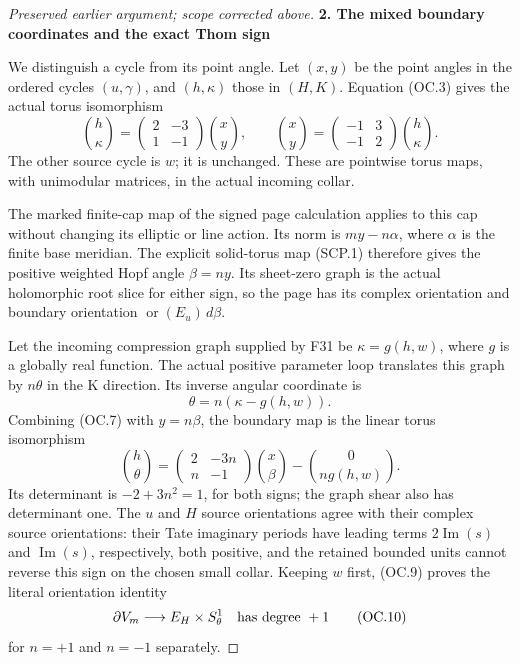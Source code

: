 \begin{proof}[Preserved earlier argument; scope corrected above]
\par

\medskip\noindent\textbf{2. The mixed boundary coordinates and the exact Thom sign}

\par\nobreak

We distinguish a cycle from its point angle. Let \((x,y)\) be the point
angles in the ordered cycles \((u,\gamma)\), and \((h,\kappa)\) those in
\((H,K)\). Equation (OC.3) gives the actual torus isomorphism
\[
 \binom h\kappa=
 \begin{pmatrix}2&-3\\1&-1\end{pmatrix}\binom xy,
 \qquad
 \binom xy=
 \begin{pmatrix}-1&3\\-1&2\end{pmatrix}\binom h\kappa.
 \tag{OC.7}
\]
The other source cycle is \(w\); it is unchanged. These are pointwise
torus maps, with unimodular matrices, in the actual incoming collar.

The marked finite-cap map of the signed page calculation applies to
this cap without changing its elliptic or line action. Its norm is
\(m y-n \alpha\), where \(\alpha\) is the finite base meridian. The explicit
solid-torus map (SCP.1) therefore gives the positive weighted Hopf
angle \(\beta=n y\). Its sheet-zero graph is the actual holomorphic root
slice for either sign, so the page has its complex orientation and
boundary orientation \(\operatorname{or}(E_u)\,d\beta\).

Let the incoming compression graph supplied by F31 be
\(\kappa=g(h,w)\), where \(g\) is a globally real function. The actual positive
parameter loop translates this graph by \(n \theta\) in the K direction.
Its inverse angular coordinate is
\[
 \theta=n(\kappa-g(h,w)).
 \tag{OC.8}
\]
Combining (OC.7) with \(y=n \beta\), the boundary map is the linear torus
isomorphism
\[
 \binom h\theta=
 \begin{pmatrix}2&-3n\\ n&-1\end{pmatrix}\binom x\beta
                  -\binom0{n g(h,w)}.
 \tag{OC.9}
\]
Its determinant is \(-2+3n^2=1\), for both signs; the graph shear also
has determinant one. The \(u\) and \(H\) source orientations agree with
their complex source orientations: their Tate imaginary periods have
leading terms \(2 \operatorname{Im}(s)\) and \(\operatorname{Im}(s)\), respectively, both positive, and
the retained bounded units cannot reverse this sign on the chosen
small collar. Keeping \(w\) first, (OC.9) proves the literal orientation
identity
\[
 \partial V_m\longrightarrow E_H\times S^1_\theta
                  \quad\hbox{has degree }+1
 \tag{OC.10}
\]
for \(n=+1\) and \(n=-1\) separately.


\end{proof}
